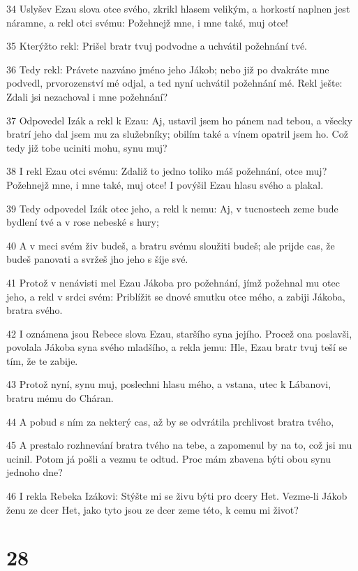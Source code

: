 \par 34 Uslyšev Ezau slova otce svého, zkrikl hlasem velikým, a horkostí naplnen jest náramne, a rekl otci svému: Požehnejž mne, i mne také, muj otce!
\par 35 Kterýžto rekl: Prišel bratr tvuj podvodne a uchvátil požehnání tvé.
\par 36 Tedy rekl: Právete nazváno jméno jeho Jákob; nebo již po dvakráte mne podvedl, prvorozenství mé odjal, a ted nyní uchvátil požehnání mé. Rekl ješte: Zdali jsi nezachoval i mne požehnání?
\par 37 Odpovedel Izák a rekl k Ezau: Aj, ustavil jsem ho pánem nad tebou, a všecky bratrí jeho dal jsem mu za služebníky; obilím také a vínem opatril jsem ho. Což tedy již tobe uciniti mohu, synu muj?
\par 38 I rekl Ezau otci svému: Zdaliž to jedno toliko máš požehnání, otce muj? Požehnejž mne, i mne také, muj otce! I povýšil Ezau hlasu svého a plakal.
\par 39 Tedy odpovedel Izák otec jeho, a rekl k nemu: Aj, v tucnostech zeme bude bydlení tvé a v rose nebeské s hury;
\par 40 A v meci svém živ budeš, a bratru svému sloužiti budeš; ale prijde cas, že budeš panovati a svržeš jho jeho s šíje své.
\par 41 Protož v nenávisti mel Ezau Jákoba pro požehnání, jímž požehnal mu otec jeho, a rekl v srdci svém: Priblížit se dnové smutku otce mého, a zabiji Jákoba, bratra svého.
\par 42 I oznámena jsou Rebece slova Ezau, staršího syna jejího. Procež ona poslavši, povolala Jákoba syna svého mladšího, a rekla jemu: Hle, Ezau bratr tvuj teší se tím, že te zabije.
\par 43 Protož nyní, synu muj, poslechni hlasu mého, a vstana, utec k Lábanovi, bratru mému do Cháran.
\par 44 A pobud s ním za nekterý cas, až by se odvrátila prchlivost bratra tvého,
\par 45 A prestalo rozhnevání bratra tvého na tebe, a zapomenul by na to, což jsi mu ucinil. Potom já pošli a vezmu te odtud. Proc mám zbavena býti obou synu jednoho dne?
\par 46 I rekla Rebeka Izákovi: Stýšte mi se živu býti pro dcery Het. Vezme-li Jákob ženu ze dcer Het, jako tyto jsou ze dcer zeme této, k cemu mi život?

\chapter{28}

